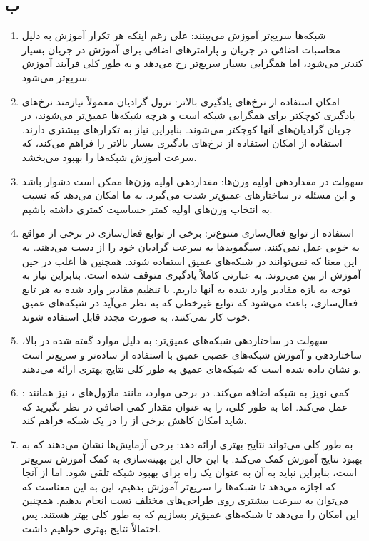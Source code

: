 \documentclass{article}
\begin{document}
\subsection{ب}
\begin{enumerate}
\item شبکه‌ها سریع‌تر آموزش می‌بینند: علی رغم اینکه هر تکرار آموزش به دلیل محاسبات اضافی در جریان  و پارامترهای اضافی برای آموزش در جریان  بسیار کندتر می‌شود، اما همگرایی بسیار سریع‌تر رخ می‌دهد و به طور کلی فرآیند آموزش سریع‌تر می‌شود.
\item امکان استفاده از نرخ‌های یادگیری بالاتر: نزول گرادیان معمولاً نیازمند نرخ‌های یادگیری کوچکتر برای همگرایی شبکه است و هرچه شبکه‌ها عمیق‌تر می‌شوند، در جریان  گرادیان‌های آنها کوچکتر می‌شوند. بنابراین نیاز به تکرارهای بیشتری دارند. استفاده از  امکان استفاده از نرخ‌های یادگیری بسیار بالاتر را فراهم می‌کند، که سرعت آموزش شبکه‌ها را بهبود می‌بخشد.
\item سهولت در مقداردهی اولیه وزن‌ها: مقداردهی اولیه وزن‌ها ممکن است دشوار باشد و این مسئله در ساختارهای عمیق‌تر شدت می‌گیرد.  به ما امکان می‌دهد که نسبت به انتخاب وزن‌های اولیه کمتر حساسیت کمتری داشته باشیم.
\item استفاده از توابع فعال‌سازی متنوع‌تر: برخی از توابع فعال‌سازی در برخی از مواقع به خوبی عمل نمی‌کنند. سیگموید‌ها به سرعت گرادیان خود را از دست می‌دهند. به این معنا که نمی‌توانند در شبکه‌های عمیق استفاده شوند. همچنین ها اغلب در حین آموزش از بین می‌روند. به عبارتی کاملاً یادگیری متوقف شده است. بنابراین نیاز به توجه به بازه مقادیر وارد شده به آنها داریم. با تنظیم مقادیر وارد شده به هر تابع فعال‌سازی،  باعث می‌شود که توابع غیرخطی که به نظر می‌آید در شبکه‌های عمیق خوب کار نمی‌کنند، به صورت مجدد قابل استفاده شوند.
\item سهولت در ساختاردهی شبکه‌های عمیق‌تر: به دلیل موارد گفته شده در بالا، ساختاردهی و آموزش شبکه‌های عصبی عمیق با استفاده از  ساده‌تر و سریع‌تر است و نشان داده شده است که شبکه‌های عمیق به طور کلی نتایج بهتری ارائه می‌دهند.
\item {}:  کمی نویز به شبکه اضافه می‌کند. در برخی موارد، مانند ماژول‌های ،  نیز همانند  عمل می‌کند. اما به طور کلی،  را به عنوان مقدار کمی  اضافی در نظر بگیرید که شاید امکان کاهش برخی از  را در یک شبکه فراهم کند.
\item به طور کلی می‌تواند نتایج بهتری ارائه دهد: برخی آزمایش‌ها نشان می‌دهند که  به بهبود نتایج آموزش کمک می‌کند. با این حال این بهینه‌سازی به کمک آموزش سریع‌تر است، بنابراین نباید به آن به عنوان یک راه برای بهبود شبکه تلقی شود. اما از آنجا که اجازه می‌دهد تا شبکه‌ها را سریع‌تر آموزش بدهیم، این به این معناست که می‌توان به سرعت بیشتری روی طراحی‌های مختلف تست انجام بدهیم. همچنین این امکان را می‌دهد تا شبکه‌های عمیق‌تر بسازیم که به طور کلی بهتر هستند. پس احتمالاً نتایج بهتری خواهیم داشت.
\end{enumerate}
\end{document}
